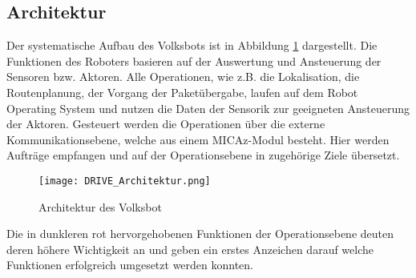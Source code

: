 \subsection{Architektur}

Der systematische Aufbau des Volksbots ist in Abbildung \ref{fig:architecture_volksbot} dargestellt. Die Funktionen des Roboters basieren auf der Auswertung und Ansteuerung der Sensoren bzw. Aktoren. Alle Operationen, wie z.B. die Lokalisation, die Routenplanung, der Vorgang der Paketübergabe, laufen auf dem Robot Operating System und nutzen die Daten der Sensorik zur geeigneten Ansteuerung der Aktoren. Gesteuert werden die Operationen über die externe Kommunikationsebene, welche aus einem MICAz-Modul besteht. Hier werden Aufträge empfangen und auf der Operationsebene in zugehörige Ziele übersetzt.

\begin{figure}[h!]
 \centering
		\texttt{[image: DRIVE\_Architektur.png]}
	\caption{Architektur des Volksbot}
	\label{fig:architecture_volksbot}
\end{figure}

Die in dunkleren rot hervorgehobenen Funktionen der Operationsebene deuten deren höhere Wichtigkeit an und geben ein erstes Anzeichen darauf welche Funktionen erfolgreich umgesetzt werden konnten.